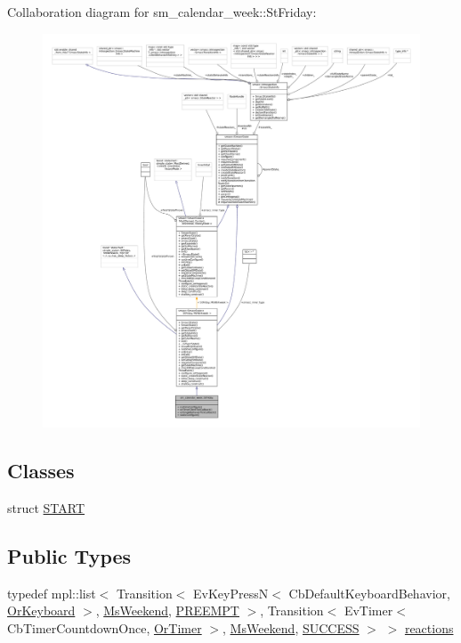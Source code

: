 Collaboration diagram for sm\+\_\+calendar\+\_\+week\+:\+:St\+Friday\+:
\nopagebreak
\begin{figure}[H]
\begin{center}
\leavevmode
\includegraphics[width=350pt]{structsm__calendar__week_1_1StFriday__coll__graph}
\end{center}
\end{figure}
\subsection*{Classes}
\begin{DoxyCompactItemize}
\item 
struct \hyperlink{structsm__calendar__week_1_1StFriday_1_1START}{S\+T\+A\+RT}
\end{DoxyCompactItemize}
\subsection*{Public Types}
\begin{DoxyCompactItemize}
\item 
typedef mpl\+::list$<$ Transition$<$ Ev\+Key\+PressN$<$ Cb\+Default\+Keyboard\+Behavior, \hyperlink{classsm__calendar__week_1_1OrKeyboard}{Or\+Keyboard} $>$, \hyperlink{classsm__calendar__week_1_1MsWeekend}{Ms\+Weekend}, \hyperlink{classPREEMPT}{P\+R\+E\+E\+M\+PT} $>$, Transition$<$ Ev\+Timer$<$ Cb\+Timer\+Countdown\+Once, \hyperlink{classsm__calendar__week_1_1OrTimer}{Or\+Timer} $>$, \hyperlink{classsm__calendar__week_1_1MsWeekend}{Ms\+Weekend}, \hyperlink{classSUCCESS}{S\+U\+C\+C\+E\+SS} $>$ $>$ \hyperlink{structsm__calendar__week_1_1StFriday_a3086092f43c6f0426130aa46b55edaab}{reactions}
\end{DoxyCompactItemize}
